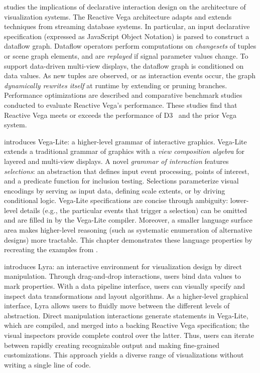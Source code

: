  studies the implications of declarative interaction design on
the architecture of visualization systems. The Reactive Vega architecture adapts
and extends techniques from streaming database systems. In particular, an input
declarative specification (expressed as JavaScript Object Notation) is parsed to
construct a dataflow graph. Dataflow operators perform computations on
\emph{changesets} of tuples or scene graph elements, and are \emph{replayed} if
signal parameter values change. To support data-driven multi-view displays, the
dataflow graph is conditioned on data values. As new tuples are observed, or as
interaction events occur, the graph \emph{dynamically rewrites itself} at
runtime by extending or pruning branches. Performance optimizations are
described and comparative benchmark studies conducted to evaluate Reactive
Vega's performance. These studies find that Reactive Vega meets or exceeds the
performance of D3~\cite{bostock:d3} and the prior Vega system.

 introduces Vega-Lite: a higher-level grammar of interactive
graphics. Vega-Lite extends a traditional grammar of graphics with a \emph{view
composition algebra} for layered and multi-view displays. A novel \emph{grammar
of interaction} features \emph{selections}: an abstraction that defines input
event processing, points of interest, and a predicate function for inclusion
testing. Selections parameterize visual encodings by serving as input data,
defining scale extents, or by driving conditional logic. Vega-Lite
specifications are concise through ambiguity: lower-level details (e.g., the
particular events that trigger a selection) can be omitted and are filled in by
the Vega-Lite compiler. Moreover, a smaller language surface area makes
higher-level reasoning (such as systematic enumeration of alternative designs)
more tractable. This chapter demonstrates these language properties by
recreating the examples from .

 introduces Lyra: an interactive environment for visualization
design by direct manipulation. Through drag-and-drop interactions, users bind
data values to mark properties. With a data pipeline interface, users can
visually specify and inspect data transformations and layout algorithms. As a
higher-level graphical interface, Lyra allows users to fluidly move between the
different levels of abstraction. Direct manipulation interactions generate
statements in Vega-Lite, which are compiled, and merged into a backing Reactive
Vega specification; the visual inspectors provide complete control over the
latter. Thus, users can iterate between rapidly creating recognizable output and
making fine-grained customizations. This approach yields a diverse range of
visualizations without writing a single line of code.

